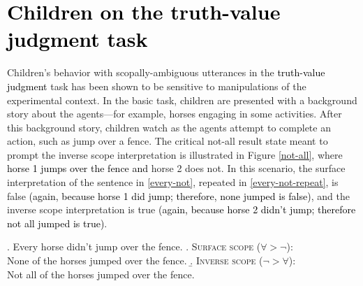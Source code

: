 \documentclass[cm]{glossa}
\newcommand{\lp}[1]{\textcolor{black}{#1}} %
\begin{document}
\section{
\lp{Children on the truth-value judgment task}
} \label{background}





Children's behavior with scopally-ambiguous utterances in the 
\lp{truth-value judgment}
task has been shown to be sensitive to manipulations of the experimental context. In the basic task, children are presented with a background story about the agents---for example, horses engaging in some activities.  After this background story, children watch as the agents attempt to complete an action, such as jump over a fence. The critical not-all result state meant to prompt the inverse scope interpretation is illustrated in Figure \ref{not-all}, where \lp{horse 1 jumps over the fence and} horse 2 does not. In this scenario, the surface interpretation of the sentence in \ref{every-not}, repeated in \ref{every-not-repeat}, is false \lp{(again, because horse 1 did jump; therefore, none jumped is false)},  and the inverse scope interpretation is true \lp{(again, because horse 2 didn't jump; therefore not all jumped is true)}.  

\ex. \label{every-not-repeat}
Every horse didn't jump over the fence.
\a. \label{every-not-surface-repeat}
\textsc{Surface scope} ($\forall > \neg$):\\
None of the horses jumped over the fence.
\b. \label{every-not-inverse-repeat}
\textsc{Inverse scope} ($\neg > \forall$):\\
Not all of the horses jumped over the fence. 
\end{document}
